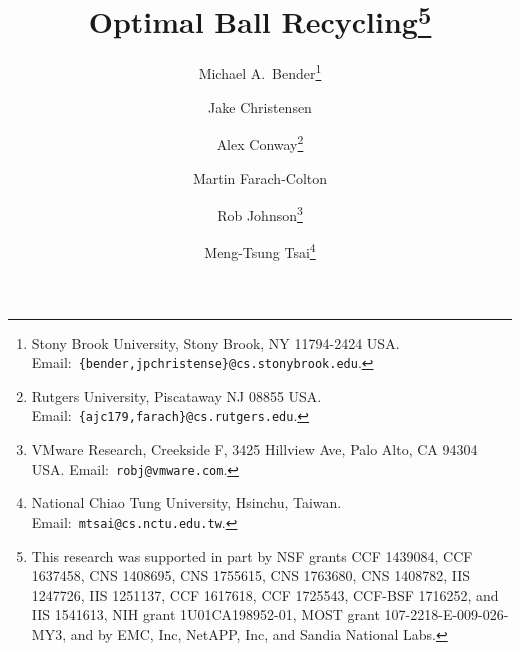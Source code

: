 
\author{
Michael A.~Bender\thanks{
Stony Brook University, 
Stony Brook, NY 11794-2424 USA. 
Email:~\texttt{\{bender,jpchristense\}@cs.stonybrook.edu}.}
\and
Jake Christensen\footnotemark[2]
\and
Alex Conway\thanks{
Rutgers University, Piscataway NJ 08855 USA.  
Email:~\texttt{\{ajc179,farach\}@cs.rutgers.edu}.}
\and
Martin Farach-Colton\footnotemark[3]
\and
Rob Johnson\thanks{
VMware Research,
Creekside F,
3425 Hillview Ave,
Palo Alto, CA 94304 USA.
Email:~\texttt{robj@vmware.com}.}
\and
Meng-Tsung Tsai\thanks{
National Chiao Tung University, Hsinchu, Taiwan.
Email:~\texttt{mtsai@cs.nctu.edu.tw}.}}

\title{Optimal Ball Recycling\thanks{
This research was supported in part by NSF grants 
%
CCF 1439084, %
CCF 1637458, %
CNS 1408695, %
CNS 1755615, %
CNS 1763680, %
CNS 1408782, %
IIS 1247726, %
IIS 1251137, %
CCF 1617618, %
CCF 1725543, %
CCF-BSF 1716252, %
and IIS 1541613, %
NIH grant 1U01CA198952-01, %
MOST grant 107-2218-E-009-026-MY3, %
and by EMC, Inc, NetAPP, Inc, and Sandia National Labs.
}}




